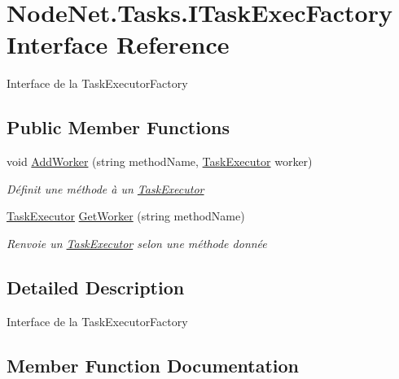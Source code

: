 \hypertarget{interface_node_net_1_1_tasks_1_1_i_task_exec_factory}{}\section{Node\+Net.\+Tasks.\+I\+Task\+Exec\+Factory Interface Reference}
\label{interface_node_net_1_1_tasks_1_1_i_task_exec_factory}


Interface de la Task\+Executor\+Factory  


\subsection*{Public Member Functions}
\begin{DoxyCompactItemize}
\item 
void \hyperlink{interface_node_net_1_1_tasks_1_1_i_task_exec_factory_a68c7e7504eb0001548c05a77843ab8c4}{Add\+Worker} (string method\+Name, \hyperlink{class_node_net_1_1_tasks_1_1_task_executor}{Task\+Executor} worker)
\begin{DoxyCompactList}\small\item\em Définit une méthode à un \hyperlink{class_node_net_1_1_tasks_1_1_task_executor}{Task\+Executor} \end{DoxyCompactList}\item 
\hyperlink{class_node_net_1_1_tasks_1_1_task_executor}{Task\+Executor} \hyperlink{interface_node_net_1_1_tasks_1_1_i_task_exec_factory_a16265454dbff396835e0676dfe5b5197}{Get\+Worker} (string method\+Name)
\begin{DoxyCompactList}\small\item\em Renvoie un \hyperlink{class_node_net_1_1_tasks_1_1_task_executor}{Task\+Executor} selon une méthode donnée \end{DoxyCompactList}\end{DoxyCompactItemize}


\subsection{Detailed Description}
Interface de la Task\+Executor\+Factory 



\subsection{Member Function Documentation}
\mbox{\label{interface_node_net_1_1_tasks_1_1_i_task_exec_factory_a68c7e7504eb0001548c05a77843ab8c4}} 
